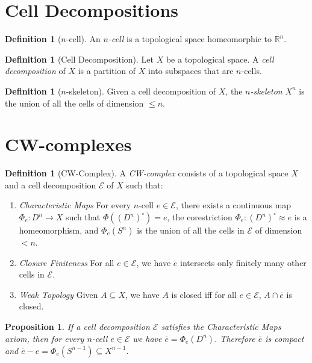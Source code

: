 \documentclass{book}
\newtheorem{prop}[ax]{Proposition}
\theoremstyle{definition}
\newtheorem{df}[ax]{Definition}
\begin{document}
\section{Cell Decompositions}

\begin{df}[$n$-cell]
An \emph{$n$-cell} is a topological space homeomorphic to $\mathbb{R}^n$.
\end{df}

\begin{df}[Cell Decomposition]
Let $X$ be a topological space. A \emph{cell decomposition} of $X$ is a partition of $X$ into subspaces that are $n$-cells.
\end{df}

\begin{df}[$n$-skeleton]
Given a cell decomposition of $X$, the \emph{$n$-skeleton} $X^n$ is the union of all the cells of dimension $\leq n$.
\end{df}

\section{CW-complexes}

\begin{df}[CW-Complex]
A \emph{CW-complex} consists of a topological space $X$ and a cell decomposition $\mathcal{E}$ of $X$ such that:
\begin{enumerate}
\item \emph{Characteristic Maps} For every $n$-cell $e \in \mathcal{E}$, there exists a continuous map $\Phi_e : D^n \rightarrow X$ such that $\Phi((D^n)^\circ) = e$, the corestriction $\Phi_e : (D^n)^\circ \approx e$ is a homeomorphism, and $\Phi_e(S^n)$ is the union of all the cells in $\mathcal{E}$ of dimension $< n$.
\item \emph{Closure Finiteness} For all $e \in \mathcal{E}$, we have $\overline{e}$ intersects only finitely many other cells in $\mathcal{E}$.
\item \emph{Weak Topology} Given $A \subseteq X$, we have $A$ is closed iff for all $e \in \mathcal{E}$, $A \cap \overline{e}$ is closed.
\end{enumerate}
\end{df}

\begin{prop}
If a cell decomposition $\mathcal{E}$ satisfies the Characteristic Maps axiom, then for every $n$-cell $e \in \mathcal{E}$ we have $\overline{e} = \Phi_e(D^n)$. Therefore $\overline{e}$ is compact and $\overline{e} - e = \Phi_e(S^{n-1}) \subseteq X^{n-1}$.
\end{prop}
\end{document}

